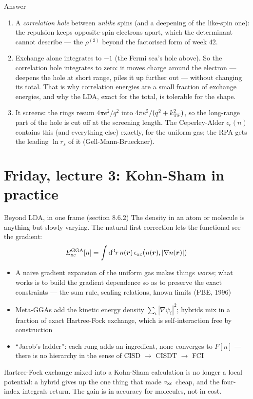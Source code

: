 \documentclass[aspectratio=169,10pt]{beamer}
\newcounter{thinkctr}
\newcommand{\thinka}[1]{%
  \vfill
  \begin{tcolorbox}[enhanced,colback=paleteal,colframe=teal,boxrule=1.2pt,arc=4pt,
    grow to left by=6mm,grow to right by=6mm,
    left=16pt,right=16pt,top=16pt,bottom=18pt,
    fonttitle=\bfseries\Large,fontupper=\large,
    title={Answer to pause \#\thethinkctr}]
  #1
  \end{tcolorbox}
  \vfill}
\newcommand{\warnbox}[1]{%
  \begin{tcolorbox}[colback=palewarm,colframe=warm,title={\bfseries A trap to avoid}]
  #1
  \end{tcolorbox}}
\newcommand{\dd}{\mathrm{d}}
\begin{document}
\begin{frame}[shrink=2]{Answer}
  \thinka{
  \begin{enumerate}
    \item A \emph{correlation hole} between \emph{unlike} spins (and a deepening of the like-spin one): the repulsion keeps opposite-spin electrons apart, which the determinant cannot describe --- the $\rho^{(2)}$ beyond the factorised form of week 42.
    \item Exchange alone integrates to $-1$ (the Fermi sea's hole above). So the correlation hole integrates to \alert{zero}: it moves charge around the electron --- deepens the hole at short range, piles it up further out --- without changing its total. That is why correlation energies are a small fraction of exchange energies, and why the LDA, exact for the total, is tolerable for the shape.
    \item It screens: the rings resum $4\pi e^2/q^2$ into $4\pi e^2/(q^2+k_{\rm TF}^2)$, so the long-range part of the hole is cut off at the screening length. The Ceperley-Alder $\epsilon_c(n)$ contains this (and everything else) exactly, for the uniform gas; the RPA gets the leading $\ln r_s$ of it (Gell-Mann-Brueckner).
  \end{enumerate}}
\end{frame}

\section{Friday, lecture 3: Kohn-Sham in practice}

\begin{frame}[shrink=5]{Beyond LDA, in one frame (section 8.6.2)}
  The density in an atom or molecule is anything but slowly varying. The natural first correction lets the functional see the gradient:
  \[
    E_{\rm xc}^{\rm GGA}[n]=\int\dd^3r\,n(\bm r)\,\epsilon_{\rm xc}\bigl(n(\bm r),|\nabla n(\bm r)|\bigr)
  \]
  \begin{itemize}
    \item A naive gradient expansion of the uniform gas makes things \emph{worse}; what works is to build the gradient dependence so as to preserve the exact constraints --- the sum rule, scaling relations, known limits (PBE, 1996)
    \item Meta-GGAs add the kinetic energy density $\sum_i|\nabla\psi_i|^2$; hybrids mix in a fraction of exact Hartree-Fock exchange, which is self-interaction free by construction
    \item ``Jacob's ladder'': each rung adds an ingredient, none converges to $F[n]$ --- there is no hierarchy in the sense of CISD $\to$ CISDT $\to$ FCI
  \end{itemize}
  \warnbox{Hartree-Fock exchange mixed into a Kohn-Sham calculation is no longer a local potential: a hybrid gives up the one thing that made $v_{\rm xc}$ cheap, and the four-index integrals return. The gain is in accuracy for molecules, not in cost.}
\end{frame}
\end{document}
